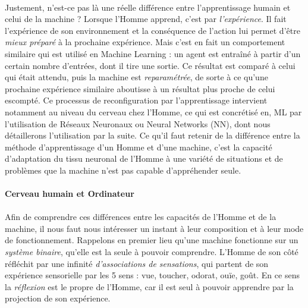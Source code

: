 \paragraph{} Justement, n'est-ce pas là une réelle différence entre l'apprentissage humain et celui de la machine ?
Lorsque l'Homme apprend, c'est par \emph{l'expérience}. Il fait l'expérience de son environnement et la
conséquence de l'action lui permet d'être \emph{mieux préparé} à la prochaine expérience. Mais c'est en fait un
comportement similaire qui est utilisé en Machine Learning : un agent est entraîné à partir d'un certain nombre
d'entrées, dont il tire une sortie. Ce résultat est comparé à celui qui était attendu, puis la machine est
\emph{reparamétrée}, de sorte à ce qu'une prochaine expérience similaire aboutisse à un résultat plus proche 
de celui escompté. Ce processus de reconfiguration par l'apprentissage intervient notamment au niveau du cerveau
chez l'Homme, ce qui est concrétisé en, ML par l'utilisation de Réseaux Neuronaux ou Neural Networks (NN), dont
nous détaillerons l'utilisation par la suite. Ce qu'il faut retenir de la différence entre la méthode d'apprentissage
d'un Homme et d'une machine, c'est la capacité d'adaptation du tissu neuronal de l'Homme à une variété de situations
et de problèmes que la machine n'est pas capable d'appréhender seule.

\paragraph{Cerveau humain et Ordinateur}

\paragraph{} Afin de comprendre ces différences entre les capacités de l'Homme et de la machine, il nous faut nous
intéresser un instant à leur composition et à leur mode de fonctionnement. Rappelons en premier lieu qu'une machine
fonctionne sur un \emph{système binaire}, qu'elle est la seule à pouvoir comprendre. L'Homme de son côté réfléchit
par une infinité \emph{d'associations de sensations}, qui partent de son expérience sensorielle par les 5 sens : vue,
toucher, odorat, ouïe, goût. En ce sens la \emph{réflexion} est le propre de l'Homme, car il est seul à pouvoir 
apprendre par la projection de son expérience. \cite{Internet5}

